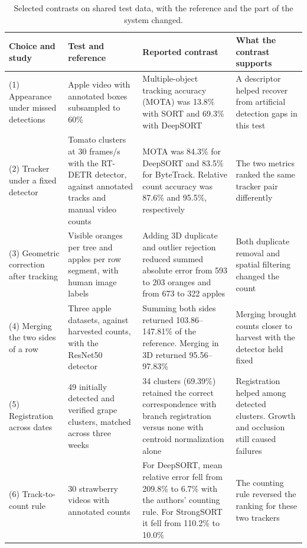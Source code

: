 \begin{table}[!t]
\centering
\caption{Selected contrasts on shared test data, with the reference and the part of the system changed.}\label{tab:assoc}
\footnotesize
\setlength{\tabcolsep}{4pt}
\begin{tabularx}{\textwidth}{@{}L{2.6cm}L{3.4cm}YL{3.5cm}@{}}
\toprule
Choice and study & Test and reference & Reported contrast & What the contrast supports\\
\midrule
(1) Appearance under missed detections \citep{villacres2023apple} & Apple video with annotated boxes subsampled to 60\% & Multiple-object tracking accuracy (MOTA) was 13.8\% with SORT and 69.3\% with DeepSORT & A descriptor helped recover from artificial detection gaps in this test\\
\addlinespace
(2) Tracker under a fixed detector \citep{qi2025assessment} & Tomato clusters at 30 frames/s with the RT-DETR detector, against annotated tracks and manual video counts & MOTA was 84.3\% for DeepSORT and 83.5\% for ByteTrack. Relative count accuracy was 87.6\% and 95.5\%, respectively & The two metrics ranked the same tracker pair differently\\
\addlinespace
(3) Geometric correction after tracking \citep{liu2018robust} & Visible oranges per tree and apples per row segment, with human image labels & Adding 3D duplicate and outlier rejection reduced summed absolute error from 593 to 203 oranges and from 673 to 322 apples & Both duplicate removal and spatial filtering changed the count\\
\addlinespace
(4) Merging the two sides of a row \citep{hani2020comparative} & Three apple datasets, against harvested counts, with the ResNet50 detector & Summing both sides returned 103.86--147.81\% of the reference. Merging in 3D returned 95.56--97.83\% & Merging brought counts closer to harvest with the detector held fixed\\
\addlinespace
(5) Registration across dates \citep{yoshida2026cross} & 49 initially detected and verified grape clusters, matched across three weeks & 34 clusters (69.39\%) retained the correct correspondence with branch registration versus none with centroid normalization alone & Registration helped among detected clusters. Growth and occlusion still caused failures\\
\addlinespace
(6) Track-to-count rule \citep{zhou2024advancing} & 30 strawberry videos with annotated counts & For DeepSORT, mean relative error fell from 209.8\% to 6.7\% with the authors' counting rule. For StrongSORT it fell from 110.2\% to 10.0\% & The counting rule reversed the ranking for these two trackers\\

\end{tabularx}
\end{table}
